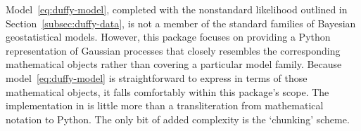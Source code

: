 \documentclass[article]{jss}
\begin{document}
\bigskip
Model~\ref{eq:duffy-model}, completed with the nonstandard likelihood outlined in Section~\ref{subsec:duffy-data}, is not a member of the standard families of Bayesian geostatistical models. However, this package focuses on providing a Python representation of Gaussian processes that closely resembles the corresponding mathematical objects rather than covering a particular model family. Because model~\ref{eq:duffy-model} is straightforward to express in terms of those mathematical objects, it falls comfortably within this package's scope. The implementation in  is little more than a transliteration from mathematical notation to Python. The only bit of added complexity is the `chunking' scheme.

% 
\end{document}
